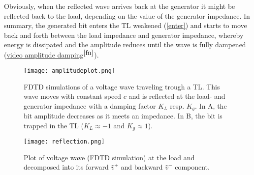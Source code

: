 Obviously, when the reflected wave arrives back at the generator it might be reflected back to the load, depending on the value of the generator impedance. In summary, the generated bit enters the TL weakened (\ref{enter}) and starts to move back and forth between the load impedance and generator impedance, whereby energy is dissipated and the amplitude reduces until the wave is fully dampened (\href{https://ugentbe-my.sharepoint.com/:f:/g/personal/constantijn_coppers_ugent_be/Evlx5Q0EKRhCggn-R1x3NKQBhiF82wRowFP4pT1nCn1ymg?e=Xi2V3R}{video amplitude damping}$^{\ref{fn}}$).

\begin{figure}[h!]
\centering
\texttt{[image: amplitudeplot.png]}
\caption{FDTD simulations of a voltage wave traveling trough a TL. This wave moves with constant speed $c$ and is reflected at the load- and generator impedance with a damping factor $K_L$ resp. $K_g$. In A, the bit amplitude decreases as it meets an impedance. In B, the bit is trapped in the TL ($K_L\approx-1$ and $K_g \approx1$).}\label{fig:damp}
\end{figure}

\begin{figure}[h!]
\centering
\texttt{[image: reflection.png]}
\caption{Plot of voltage wave (FDTD simulation) at the load and decomposed into its forward $\hat{v}^{+}$ and backward $\hat{v}^{-}$ component.}\label{fig:refl}
\end{figure}